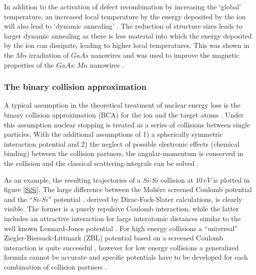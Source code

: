 In addition to the activation of defect recombination by increasing the `global' temperature, an increased local temperature by the energy deposited by the ion will also lead to `dynamic annealing' \cite{dhara_formation_2007}. The reduction of structure sizes leads to larger dynamic annealing as there is less material into which the energy deposited by the ion can dissipate, leading to higher local temperatures. This was shown in the $Mn$ irradiation of $GaAs$ nanowires \cite{borschel_ion-solid_2012,johannes_ion_2015} and was used to improve the magnetic properties of the $GaAs\! \! :\! \! Mn$ nanowires \cite{borschel_new_2011,paschoal_hopping_2012,kumar_magnetic_2013,paschoal_magnetoresistance_2014}. 


\subsubsection{The binary collision approximation}

A typical assumption in the theoretical treatment of nuclear energy loss is the binary collision approximation (BCA) for the ion and the target atoms \cite{eckstein_computer_1991}. Under this assumption nuclear stopping is treated as a series of collisions between single particles. With the additional assumptions of 1) a spherically symmetric interaction potential and 2) the neglect of possible electronic effects (chemical binding) between the collision partners, the angular-momentum is conserved in the collision and the classical scattering-integrals can be solved \cite{ziegler_stopping_1985}. 

As an example, the resulting trajectories of a $Si$-$Si$ collision at $10\,eV$ is plotted in figure \ref{SiSi}. The large difference between the Moliére screened Coulomb potential \cite{moliere_theorie_1947} and the ``$Si$-$Si$'' potential \cite{hackel_inter-nuclear_1990}, derived by Dirac-Fock-Slater calculations, is clearly visible. The former is a purely repulsive Coulomb interaction, while the latter includes an attractive interaction for large interatomic distances similar to the well known Lennard-Jones potential \cite{jones_determination_1924,eckstein_computer_1991}. For high energy collisions a ``universal'' Ziegler-Biersack-Littmark (ZBL) potential based on a screened Coulomb interaction is quite successful \cite{ziegler_stopping_1985}, however for low energy collisions a generalized formula cannot be accurate and specific potentials have to be developed for each combination of collision partners \cite{dedkov_interatomic_1995,nordlund_repulsive_1997,albe_modeling_2002,nordlund_interatomic_2008}.


